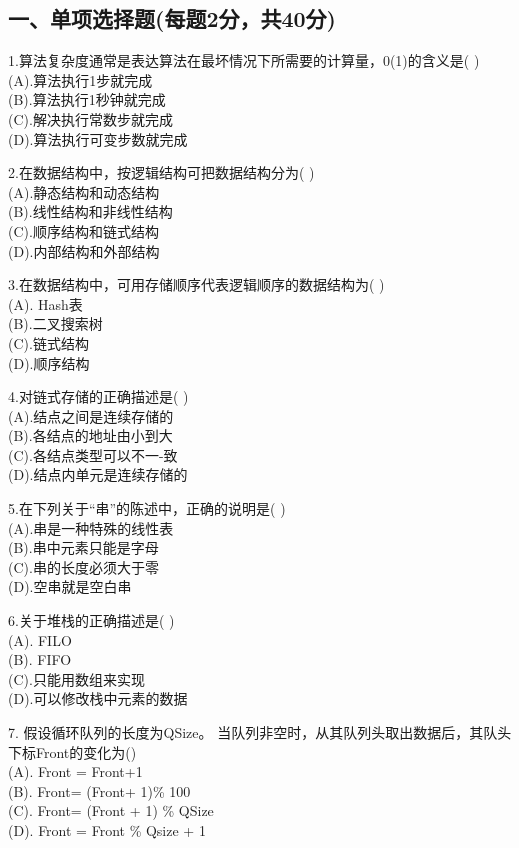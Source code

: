 

\subsection{一、单项选择题(每题2分，共40分)}

1.算法复杂度通常是表达算法在最坏情况下所需要的计算量，0(1)的含义是( ) \\
(A).算法执行1步就完成 \\
(B).算法执行1秒钟就完成 \\
(C).解决执行常数步就完成 \\
(D).算法执行可变步数就完成

2.在数据结构中，按逻辑结构可把数据结构分为( ) \\
(A).静态结构和动态结构 \\
(B).线性结构和非线性结构 \\
(C).顺序结构和链式结构 \\
(D).内部结构和外部结构

3.在数据结构中，可用存储顺序代表逻辑顺序的数据结构为( ) \\
(A). Hash表 \\
(B).二叉搜索树 \\
(C).链式结构 \\
(D).顺序结构

4.对链式存储的正确描述是( ) \\
(A).结点之间是连续存储的 \\
(B).各结点的地址由小到大 \\
(C).各结点类型可以不一-致 \\
(D).结点内单元是连续存储的

5.在下列关于“串”的陈述中，正确的说明是( ) \\
(A).串是一种特殊的线性表 \\
(B).串中元素只能是字母 \\
(C).串的长度必须大于零 \\
(D).空串就是空白串

6.关于堆栈的正确描述是( ) \\
(A). FILO \\
(B). FIFO \\
(C).只能用数组来实现 \\
(D).可以修改栈中元素的数据

7. 假设循环队列的长度为QSize。 当队列非空时，从其队列头取出数据后，其队头下标Front的变化为() \\
(A). Front = Front+1 \\
(B). Front= (Front+ 1)\% 100 \\
(C). Front= (Front + 1) \% QSize \\
(D). Front = Front \% Qsize + 1

